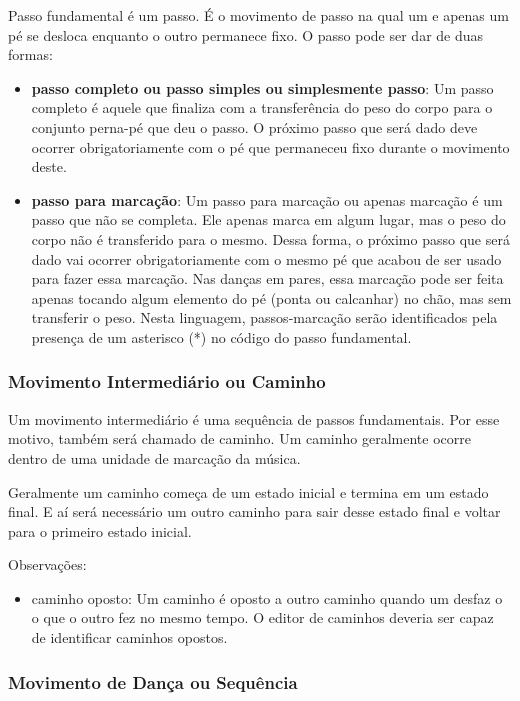 Passo fundamental é um passo. É o movimento de passo na qual um e apenas um pé se desloca enquanto o outro permanece fixo. O passo pode ser dar de duas formas:

\begin{itemize}
	\item \textbf{passo completo ou passo simples ou simplesmente passo}: Um passo completo é aquele que finaliza com a transferência do peso do corpo para o conjunto perna-pé que deu o passo. O próximo passo que será dado deve ocorrer obrigatoriamente com o pé que permaneceu fixo durante o movimento deste.
	
	\item \textbf{passo para marcação}: Um passo para marcação ou apenas marcação é um passo que não se completa. Ele apenas marca em algum lugar, mas o peso do corpo não é transferido para o mesmo. Dessa forma, o próximo passo que será dado vai ocorrer obrigatoriamente com o mesmo pé que acabou de ser usado para fazer essa marcação. Nas danças em pares, essa marcação pode ser feita apenas tocando algum elemento do pé (ponta ou calcanhar) no chão, mas sem transferir o peso. Nesta linguagem, passos-marcação serão identificados pela presença de um asterisco (*) no código do passo fundamental.
		
\end{itemize}


\subsubsection{Movimento Intermediário ou Caminho}


Um movimento intermediário é uma sequência de passos fundamentais. Por esse motivo, também será chamado de caminho. Um caminho geralmente ocorre dentro de uma unidade de marcação da música. 

Geralmente um caminho começa de um estado inicial e termina em um estado final. E aí será necessário um outro caminho para sair desse estado final e voltar para o primeiro estado inicial. 

Observações:

\begin{itemize}
	\item caminho oposto: Um caminho é oposto a outro caminho quando um desfaz o o que o outro fez no mesmo tempo. O editor de caminhos deveria ser capaz de identificar caminhos opostos. 
\end{itemize}

\subsubsection{Movimento de Dança ou Sequência}

